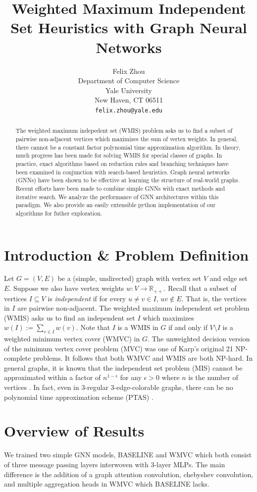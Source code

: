 \documentclass{article}
\title{Weighted Maximum Independent Set Heuristics with Graph Neural Networks}
\author{%
  Felix Zhou\\
  Department of Computer Science\\
  Yale University\\
  New Haven, CT 06511 \\
  \texttt{felix.zhou@yale.edu} \\
}
\newcommand{\R}{\mathbb{R}}
\newcommand{\sset}{\subseteq}
\begin{document}
\maketitle


\begin{abstract}
  The weighted maximum indepedent set (WMIS) problem asks us to find a subset of pairwise non-adjacent vertices
  which maximizes the sum of vertex weights.
  In general, there cannot be a constant factor polynomial time approximation algorithm.
  In theory, much progress has been made for solving WMIS for special classes of graphs.
  In practice, exact algorithms based on reduction rules and branching techniques have been examined
  in conjunction with search-based heuristics.
  Graph neural networks (GNNs) have been shown to be effective at learning the structure of real-world graphs.
  Recent efforts have been made to combine simple GNNs with exact methods and iterative search.
  We analyze the performance of GNN architectures within this paradigm.
  We also provide an easily extensible python implementation of our algorithms for futher exploration.
\end{abstract}


\section{Introduction \& Problem Definition}
Let $G=(V, E)$ be a (simple, undirected) graph with vertex set $V$
and edge set $E$.
Suppose we also have vertex weights $w: V\to \R_{++}$.
Recall that a subset of vertices $I\sset V$ is \emph{independent}
if for every $u\neq v\in I$, $uv\notin E$.
That is, the vertices in $I$ are pairwise non-adjacent.
The weighted maximum independent set problem (WMIS)
asks us to find an independent set $I$ which maximizes $w(I) := \sum_{v\in I} w(v)$.
Note that $I$ is a WMIS in $G$
if and only if $V\setminus I$ is a weighted minimum vertex cover (WMVC) in $G$.
The unweighted decision version of the minimum vertex cover problem (MVC)
was one of Karp's original 21 NP-complete problems.
It follows that both WMVC and WMIS are both NP-hard.
In general graphs,
it is known that the independent set problem (MIS) cannot be approximated within a factor of $n^{1-\epsilon}$ for any $\epsilon > 0$ where $n$ is the number of vertices \citet{zuckerman2006linear}.
In fact, even in 3-regular 3-edge-colorable graphs,
there can be no polynomial time approximation scheme (PTAS) \citet{berman1999appr}.

\section{Overview of Results}
We trained two simple GNN models,
BASELINE and WMVC which both consist of three message passing layers
interwoven with 3-layer MLPs.
The main difference is the addition of a graph attention convolution,
chebyshev convolution,
and multiple aggregation heads in WMVC which BASELINE lacks.
\end{document}
